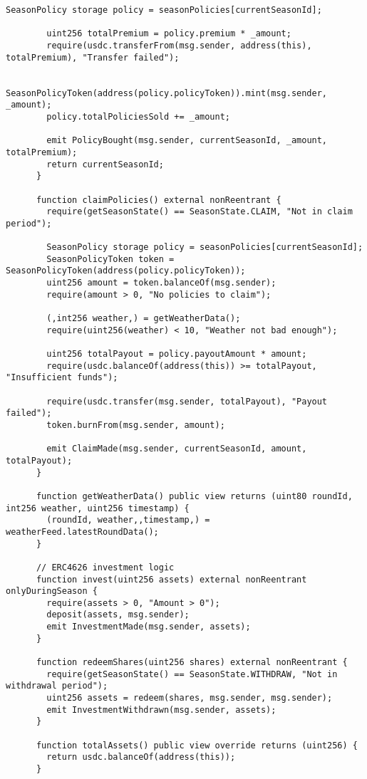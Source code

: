 \begin{lstlisting}[style=soliditystyle, caption={RainyDayFund.sol - Main Insurance Contract},label={lst:lstlistingA}]
        SeasonPolicy storage policy = seasonPolicies[currentSeasonId];

        uint256 totalPremium = policy.premium * _amount;
        require(usdc.transferFrom(msg.sender, address(this), totalPremium), "Transfer failed");

        SeasonPolicyToken(address(policy.policyToken)).mint(msg.sender, _amount);
        policy.totalPoliciesSold += _amount;

        emit PolicyBought(msg.sender, currentSeasonId, _amount, totalPremium);
        return currentSeasonId;
      }

      function claimPolicies() external nonReentrant {
        require(getSeasonState() == SeasonState.CLAIM, "Not in claim period");

        SeasonPolicy storage policy = seasonPolicies[currentSeasonId];
        SeasonPolicyToken token = SeasonPolicyToken(address(policy.policyToken));
        uint256 amount = token.balanceOf(msg.sender);
        require(amount > 0, "No policies to claim");

        (,int256 weather,) = getWeatherData();
        require(uint256(weather) < 10, "Weather not bad enough");

        uint256 totalPayout = policy.payoutAmount * amount;
        require(usdc.balanceOf(address(this)) >= totalPayout, "Insufficient funds");

        require(usdc.transfer(msg.sender, totalPayout), "Payout failed");
        token.burnFrom(msg.sender, amount);

        emit ClaimMade(msg.sender, currentSeasonId, amount, totalPayout);
      }

      function getWeatherData() public view returns (uint80 roundId, int256 weather, uint256 timestamp) {
        (roundId, weather,,timestamp,) = weatherFeed.latestRoundData();
      }

      // ERC4626 investment logic
      function invest(uint256 assets) external nonReentrant onlyDuringSeason {
        require(assets > 0, "Amount > 0");
        deposit(assets, msg.sender);
        emit InvestmentMade(msg.sender, assets);
      }

      function redeemShares(uint256 shares) external nonReentrant {
        require(getSeasonState() == SeasonState.WITHDRAW, "Not in withdrawal period");
        uint256 assets = redeem(shares, msg.sender, msg.sender);
        emit InvestmentWithdrawn(msg.sender, assets);
      }

      function totalAssets() public view override returns (uint256) {
        return usdc.balanceOf(address(this));
      }


\end{lstlisting}
